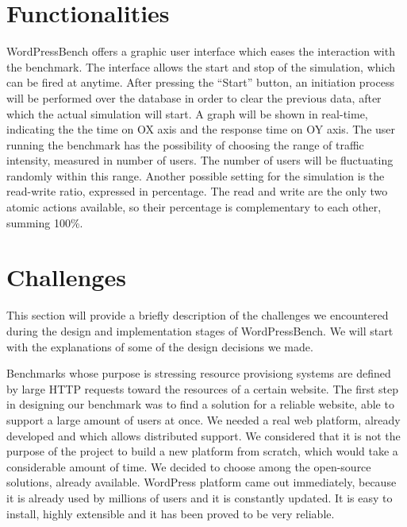 \section{Functionalities}
\label{sec:functionalities}

WordPressBench offers a graphic user interface which eases the interaction with the benchmark. The interface allows the start and stop of the simulation, which can be fired at anytime. After pressing the “Start” button, an initiation process will be performed over the database in order to clear the previous data, after which the actual simulation will start. A graph will be shown in real-time, indicating the the time on OX axis and the response time on OY axis. The user running the benchmark has the possibility of choosing the range of  traffic intensity, measured in number of users. The number of users will be fluctuating randomly within this range. Another possible setting for the simulation is the read-write ratio, expressed in percentage. The read and write are the only two atomic actions available, so their percentage is complementary to each other, summing 100\%.

\section{Challenges}
\label{sec:challenges}

This section will provide a briefly description of the challenges we encountered during the design and implementation stages of WordPressBench. We will start with the explanations of some of the design decisions we made.

Benchmarks whose purpose is stressing resource provisiong systems are defined by large HTTP requests toward the resources of a certain website. The first step in designing our benchmark was to find a solution for a reliable website, able to support a large amount of users at once. We needed a real web platform, already developed and which allows distributed support. We considered that it is not the purpose of the project to build a new platform from scratch, which would take a considerable amount of time. We decided to choose among the open-source solutions, already available. WordPress platform came out immediately, because it is already used by millions of users and it is constantly updated. It is easy to install, highly extensible and it has been proved to be very reliable.

